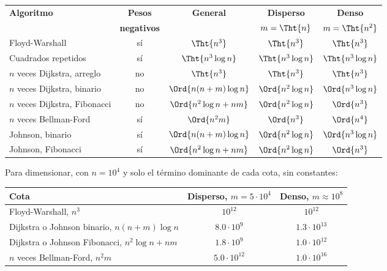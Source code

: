 \documentclass[11pt,letterpaper]{article}
\begin{document}
\begin{center}
\small
\begin{tabular}{lcccc}
  \toprule
  \textbf{Algoritmo} & \textbf{Pesos} & \textbf{General}
    & \textbf{Disperso} & \textbf{Denso} \\
  & \textbf{negativos} & & $m = \Tht{n}$ & $m = \Tht{n^2}$ \\
  \midrule
  Floyd-Warshall & sí & $\Tht{n^3}$ & $\Tht{n^3}$ & $\Tht{n^3}$ \\
  Cuadrados repetidos & sí & $\Tht{n^3 \log n}$ & $\Tht{n^3 \log n}$
    & $\Tht{n^3 \log n}$ \\
  \addlinespace
  $n$ veces Dijkstra, arreglo & no & $\Tht{n^3}$ & $\Tht{n^3}$
    & $\Tht{n^3}$ \\
  $n$ veces Dijkstra, binario & no & $\Ord{n(n + m)\log n}$
    & $\Ord{n^2 \log n}$ & $\Ord{n^3 \log n}$ \\
  $n$ veces Dijkstra, Fibonacci & no & $\Ord{n^2 \log n + nm}$
    & $\Ord{n^2 \log n}$ & $\Ord{n^3}$ \\
  \addlinespace
  $n$ veces Bellman-Ford & sí & $\Ord{n^2 m}$ & $\Ord{n^3}$
    & $\Ord{n^4}$ \\
  \addlinespace
  Johnson, binario & sí & $\Ord{n(n + m)\log n}$ & $\Ord{n^2 \log n}$
    & $\Ord{n^3 \log n}$ \\
  Johnson, Fibonacci & sí & $\Ord{n^2 \log n + nm}$
    & $\Ord{n^2 \log n}$ & $\Ord{n^3}$ \\
  \bottomrule
\end{tabular}
\end{center}

Para dimensionar, con $n = 10^4$ y solo el término dominante de cada
cota, sin constantes:
\begin{center}
\small
\begin{tabular}{lcc}
  \toprule
  \textbf{Cota} & \textbf{Disperso}, $m = 5 \cdot 10^4$
    & \textbf{Denso}, $m \approx 10^8$ \\
  \midrule
  Floyd-Warshall, $n^3$ & $10^{12}$ & $10^{12}$ \\
  Dijkstra o Johnson binario, $n(n + m)\log n$ & $8.0 \cdot 10^{9}$
    & $1.3 \cdot 10^{13}$ \\
  Dijkstra o Johnson Fibonacci, $n^2 \log n + nm$
    & $1.8 \cdot 10^{9}$ & $1.0 \cdot 10^{12}$ \\
  $n$ veces Bellman-Ford, $n^2 m$ & $5.0 \cdot 10^{12}$
    & $1.0 \cdot 10^{16}$ \\
  \bottomrule
\end{tabular}
\end{center}
\end{document}
